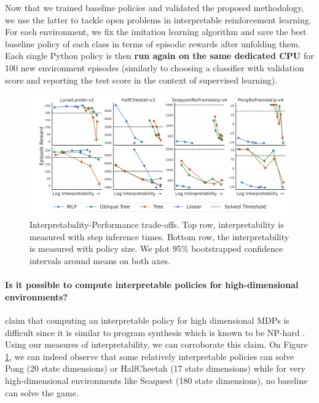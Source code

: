Now that we trained baseline policies and validated the proposed methodology, we use the latter to tackle open problems in interpretable reinforcement learning. For each environment, we fix the imitation learning algorithm and save the best baseline policy of each class in terms of episodic rewards after unfolding them. Each single Python policy is then \textbf{run again on the same dedicated CPU} for 100 new environment episodes (similarly to choosing a classifier with validation score and reporting the test score in the context of supervised learning).
\begin{figure}
    \centering
    \includegraphics[trim={1.4cm 0 0 0},clip,width=1\textwidth]{images/images_part3/trade_off_select_combine_one_plot.pdf}
    \caption{Interpretabality-Performance trade-offs. Top row, interpretability is measured with step inference times. Bottom row, the interpretability is measured with policy size. We plot 95\% bootstrapped confidence intervals around means on both axes.}
    \label{fig:trade-off-summary}
\end{figure}

\paragraph{Is it possible to compute interpretable policies for high-dimensional environments?} \cite{glanois-survey} claim that computing an interpretable policy for high dimensional MDPs is difficult since it is similar to program synthesis which is known to be NP-hard \cite{program-synth}. Using our measures of interpretability, we can corroborate this claim. On Figure \ref{fig:trade-off-summary}, we can indeed observe that some relatively interpretable policies can solve Pong (20 state dimensions) or HalfCheetah (17 state dimensions) while for very high-dimensional environments like Seaquest (180 state dimensions), no baseline can solve the game.


